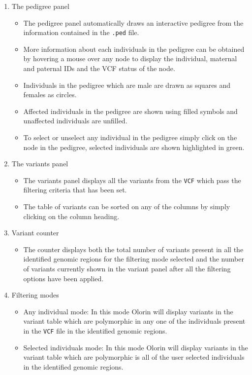 \documentclass{article}
\begin{document}
\begin{enumerate}
	\item{The pedigree panel}
		\begin{itemize}
			\item{The pedigree panel automatically draws an interactive pedigree from the information contained in the \texttt{.ped} file.}
			\item{More information about each individuals in the pedigree can be obtained by hovering a mouse over any node to display the individual, maternal and paternal IDs and the VCF status of the node.}
			\item{Individuals in the pedigree which are male are drawn as squares and females as circles.}
			\item{Affected individuals in the pedigree are shown using filled symbols and unaffected individuals are unfilled.}
			\item{To select or unselect any individual in the pedigree simply click on the node in the pedigree, selected individuals are shown highlighted in green.}
		\end{itemize}
	\item{The variants panel}
		\begin{itemize}
			\item{The variants panel displays all the variants from the \texttt{VCF} which pass the filtering criteria that has been set.}
			\item{The table of variants can be sorted on any of the columns by simply clicking on the column heading.}
		\end{itemize}
	\item{Variant counter}
		\begin{itemize}
			\item{The counter displays both the total number of variants present in all the identified genomic regions for the filtering mode selected and the number of variants currently shown in the variant panel after all the filtering options have been applied.}
		\end{itemize}
	\item{Filtering modes}
		\begin{itemize}
			\item{Any individual mode:} In this mode Olorin will display variants in the variant table which are polymorphic in any one of the individuals present in the \texttt{VCF} file in the identified genomic regions.
			\item{Selected individuals mode:} In this mode Olorin will display variants in the variant table which are polymorphic is all of the user selected individuals in the identified genomic regions.

\end{itemize}
\end{enumerate}
\end{document}
